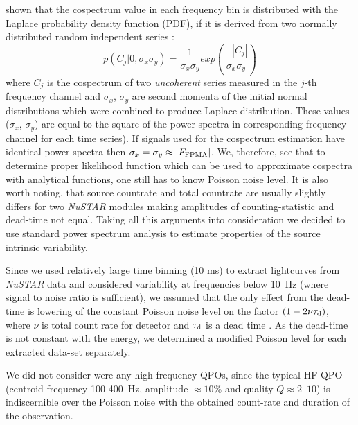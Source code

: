 \documentclass[a4paper,fleqn,usenatbib]{mnras}
\begin{document}
\citet{2017arXiv170909666H} shown that the cospectrum value in each frequency bin is distributed with the Laplace probability density function (PDF), if it is derived from two normally distributed random independent series \citep[see, e.q., eq.~14 in ][]{2017arXiv170909666H}:
\begin{equation}
        p(C_{j}|0, \sigma_x \sigma_y) = \frac{1}{\sigma_x \sigma_y} exp{\left(\frac{-|C_{j}|}{\sigma_x \sigma_y} \right)}
\end{equation}
where $C_{j}$ is the cospectrum of two {\it uncoherent} series measured in the $j$-th frequency channel and $\sigma_x$, $\sigma_y$  are second momenta of the initial normal distributions which were combined to produce Laplace distribution. 
These values ($\sigma_x$, $\sigma_y$) are equal to the square of the power spectra in corresponding frequency channel for each time series).
If signals used for the cospectrum estimation have identical power spectra then $\sigma_x = \sigma_y \approx |F_{\rm FPMA}|$.
We, therefore, see that to determine proper likelihood function which can be used to approximate cospectra with analytical functions, one still has to know Poisson noise level.
It is also worth noting, that source countrate and total countrate are usually slightly differs for two {\it NuSTAR} modules making amplitudes of counting-statistic and dead-time not equal.
Taking all this arguments into consideration we decided to use standard power spectrum analysis to estimate properties of the source intrinsic variability.

Since we used relatively large time binning (10 ms) to extract lightcurves from {\it NuSTAR} data and considered variability at frequencies below 10~Hz (where signal to noise ratio is sufficient), we assumed that the only effect from the dead-time is lowering of the constant Poisson noise level on the factor $(1 - 2\nu \tau_{\rm d})$, where $\nu$ is total count rate for detector and $\tau_{\rm d}$ is a dead time \citep{1994A&A...287...73V, 1995ApJ...449..930Z}. 
As the dead-time is not constant with the energy, we determined a modified Poisson level for each extracted data-set separately.


We did not consider were any high frequency QPOs, since the typical HF QPO (centroid frequency 100-400~Hz, amplitude $\approx10$\% and quality $Q\approx2$--$10$) is indiscernible over the Poisson noise with the obtained count-rate and duration of the observation.
\end{document}
